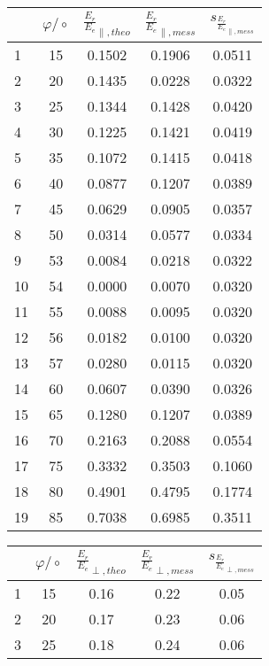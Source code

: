 \begin{center}
    \begin{tabular}{l | c c c c}
        {} & $\varphi/\circ$ & $\frac{E_r}{E_e}_{\parallel,theo}$ & $\frac{E_r}{E_e}_{\parallel,mess}$ & $s_{\frac{E_r}{E_e}_{\parallel,mess}}$\\
        \hline
        1  & 15 & 0.1502 & 0.1906 & 0.0511 \\
        2  & 20 & 0.1435 & 0.0228 & 0.0322 \\
        3  & 25 & 0.1344 & 0.1428 & 0.0420 \\
        4  & 30 & 0.1225 & 0.1421 & 0.0419 \\
        5  & 35 & 0.1072 & 0.1415 & 0.0418 \\
        6  & 40 & 0.0877 & 0.1207 & 0.0389 \\
        7  & 45 & 0.0629 & 0.0905 & 0.0357 \\
        8  & 50 & 0.0314 & 0.0577 & 0.0334 \\
        9  & 53 & 0.0084 & 0.0218 & 0.0322 \\
        10 & 54 & 0.0000 & 0.0070 & 0.0320 \\
        11 & 55 & 0.0088 & 0.0095 & 0.0320 \\
        12 & 56 & 0.0182 & 0.0100 & 0.0320 \\
        13 & 57 & 0.0280 & 0.0115 & 0.0320 \\
        14 & 60 & 0.0607 & 0.0390 & 0.0326 \\
        15 & 65 & 0.1280 & 0.1207 & 0.0389 \\
        16 & 70 & 0.2163 & 0.2088 & 0.0554 \\
        17 & 75 & 0.3332 & 0.3503 & 0.1060 \\
        18 & 80 & 0.4901 & 0.4795 & 0.1774 \\
        19 & 85 & 0.7038 & 0.6985 & 0.3511 \\
    \end{tabular}
    \begin{tabular}{l | c c c c}
        {} & $\varphi/\circ$ & $\frac{E_r}{E_e}_{\perp,theo}$ & $\frac{E_r}{E_e}_{\perp,mess}$ & $s_{\frac{E_r}{E_e}_{\perp,mess}}$\\
        \hline
        1  & 15 & 0.16 & 0.22 & 0.05 \\
        2  & 20 & 0.17 & 0.23 & 0.06 \\
        3  & 25 & 0.18 & 0.24 & 0.06 \\

\end{tabular}
\end{center}
